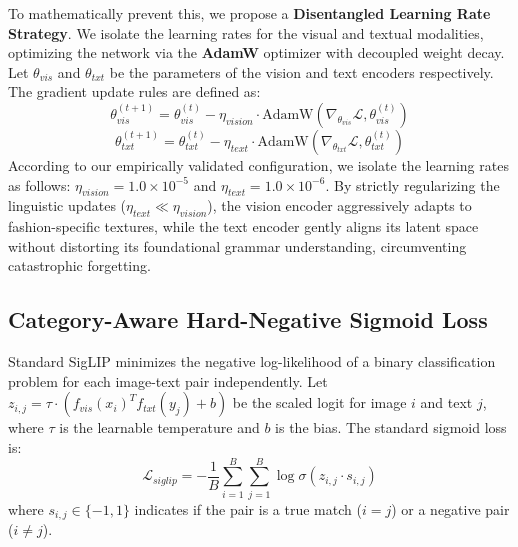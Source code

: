 \documentclass[conference]{IEEEtran}
\begin{document}
To mathematically prevent this, we propose a \textbf{Disentangled Learning Rate Strategy}. We isolate the learning rates for the visual and textual modalities, optimizing the network via the \textbf{AdamW} optimizer with decoupled weight decay. Let $\theta_{vis}$ and $\theta_{txt}$ be the parameters of the vision and text encoders respectively. The gradient update rules are defined as:
\begin{equation}
    \theta_{vis}^{(t+1)} = \theta_{vis}^{(t)} - \eta_{vision} \cdot \text{AdamW}(\nabla_{\theta_{vis}} \mathcal{L}, \theta_{vis}^{(t)})
    \label{eq:update_vis}
\end{equation}
\begin{equation}
    \theta_{txt}^{(t+1)} = \theta_{txt}^{(t)} - \eta_{text} \cdot \text{AdamW}(\nabla_{\theta_{txt}} \mathcal{L}, \theta_{txt}^{(t)})
    \label{eq:update_txt}
\end{equation}
According to our empirically validated configuration, we isolate the learning rates as follows: $\eta_{vision} = 1.0 \times 10^{-5}$ and $\eta_{text} = 1.0 \times 10^{-6}$. By strictly regularizing the linguistic updates ($\eta_{text} \ll \eta_{vision}$), the vision encoder aggressively adapts to fashion-specific textures, while the text encoder gently aligns its latent space without distorting its foundational grammar understanding, circumventing catastrophic forgetting.

\subsection{Category-Aware Hard-Negative Sigmoid Loss}
Standard SigLIP minimizes the negative log-likelihood of a binary classification problem for each image-text pair independently. Let $z_{i,j} = \tau \cdot (f_{vis}(x_i)^T f_{txt}(y_j) + b)$ be the scaled logit for image $i$ and text $j$, where $\tau$ is the learnable temperature and $b$ is the bias. The standard sigmoid loss is:
\begin{equation}
    \mathcal{L}_{siglip} = - \frac{1}{B} \sum_{i=1}^{B} \sum_{j=1}^{B} \log \sigma(z_{i,j} \cdot s_{i,j})
\end{equation}
where $s_{i,j} \in \{-1, 1\}$ indicates if the pair is a true match ($i=j$) or a negative pair ($i \neq j$). 
\end{document}
